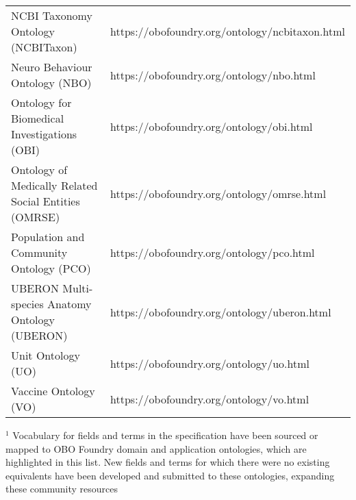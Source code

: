 \begin{table}[h!]
{\begin{tabular}{@{}ll@{}}
NCBI Taxonomy Ontology (NCBITaxon)           & https://obofoundry.org/ontology/ncbitaxon.html \\
Neuro Behaviour Ontology (NBO)               & https://obofoundry.org/ontology/nbo.html       \\
Ontology for Biomedical Investigations (OBI) & https://obofoundry.org/ontology/obi.html       \\
Ontology of Medically Related Social Entities (OMRSE)                & https://obofoundry.org/ontology/omrse.html  \\
Population and Community Ontology (PCO)      & https://obofoundry.org/ontology/pco.html       \\
UBERON Multi-species Anatomy Ontology (UBERON)                       & https://obofoundry.org/ontology/uberon.html \\
Unit Ontology (UO)                           & https://obofoundry.org/ontology/uo.html        \\
Vaccine Ontology (VO)                        & https://obofoundry.org/ontology/vo.html        \\ \bottomrule
\end{tabular}%
}
\small
\item $^1$ Vocabulary for fields and terms in the specification have been sourced or mapped to OBO Foundry domain and application ontologies, which are highlighted in this list. New fields and terms for which there were no existing equivalents have been developed and submitted to these ontologies, expanding these community resources
\end{table}